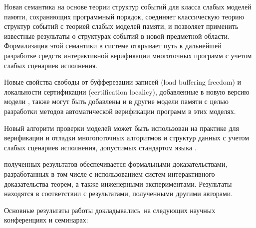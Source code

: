 {\influence} 

Новая семантика на основе теории структур событий 
для класса слабых моделей памяти, сохраняющих программный порядок,
соединяет классическую теорию структур событий 
с теорией слабых моделей памяти, и позволяет применить известные результаты 
о структурах событий в новой предметной области.  
Формализация этой семантики в системе \coq открывает 
путь к дальнейшей разработке средств 
интерактивной верификации многоточных программ  
с учетом слабых сценариев исполнения. 
 
Новые свойства свободы от буфферезации записей (load buffering freedom)
и локальности сертификации (certification localicy), 
добавленные в новую версию модели \WkmS, 
также могут быть добавлены и в другие модели памяти 
с целью разработки методов автоматической верификации программ в этих моделях. 

Новый алгоритм проверки моделей может быть использован на практике
для верификации и отладки многопоточных алгоритмов и структур данных 
с учетом слабых сценариев исполнения, допустимых стандартом языка \CLANG. 

{\reliability} полученных результатов обеспечивается 
формальными доказательствами, разработанных в том числе с использованием
систем интерактивного доказательства теорем, 
а также инженерными экспериментами. 
Результаты находятся в соответствии с результатами, полученными другими авторами.

{\probation}
Основные результаты работы докладывались~на
следующих научных конференциях и семинарах:


